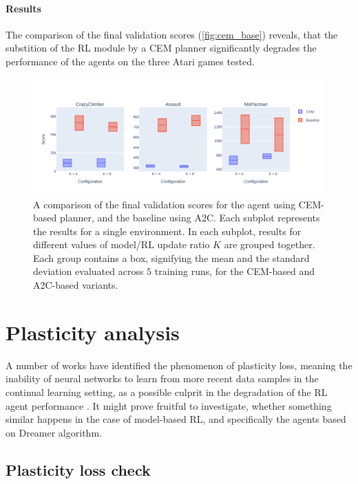 \documentclass[en]{pracamgr}
\newcommand{\figurewidth}{\linewidth}
\newcommand{\figureheight}{0.8\paperheight}
\begin{document}
\paragraph{Results} The comparison of the final validation scores (\autoref{fig:cem_base}) reveals, that the substition of the RL module by a CEM planner significantly degrades the performance of the agents on the three Atari games tested.

\begin{figure}
  \centering
  \includegraphics[width=\figurewidth,height=\figureheight,keepaspectratio]{assets/cem_base.pdf}
  \caption{A comparison of the final validation scores for the agent using CEM-based planner, and the baseline using A2C. Each subplot represents the results for a single environment. In each subplot, results for different values of model/RL update ratio $K$ are grouped together. Each group contains a box, signifying the mean and the standard deviation evaluated across $5$ training runs, for the CEM-based and A2C-based variants.}
  \label{fig:cem_base}
\end{figure}

\section{Plasticity analysis}

A number of works have identified the phenomenon of plasticity loss, meaning the inability of neural networks to learn from more recent data samples in the continual learning setting, as a possible culprit in the degradation of the RL agent performance \autocite{julianiStudyPlasticityLoss2024,nikishinPrimacyBiasDeep2022,lyleUnderstandingPlasticityNeural2023}. It might prove fruitful to investigate, whether something similar happens in the case of model-based RL, and specifically the agents based on Dreamer algorithm.

\subsection{Plasticity loss check}
\end{document}

